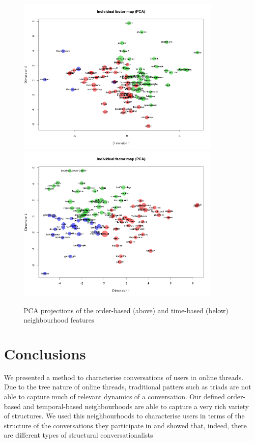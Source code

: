 \documentclass[conference]{IEEEtran}
\begin{document}
\begin{figure}
	\centering
	\includegraphics[width=0.9\textwidth]{PCA_cluster_orderbased}
	\includegraphics[width=0.9\textwidth]{PCA_cluster_timebased}
	\caption{PCA projections of the order-based (above) and time-based (below) neighbourhood features}
	\label{fig:PCA}
\end{figure}




\section{Conclusions}
We presented a method to characterise conversations of users in online threads. Due to the tree nature of online threads, traditional patters such as triads are not able to capture much of relevant dynamics of a conversation. Our defined order-based and temporal-based neighbourhoods 
are able to capture a very rich variety of structures. We used this neighbourhoods to characterise users in terms of the structure of the conversations they participate in and showed that, indeed, there are different types of structural conversationalists
\end{document}

